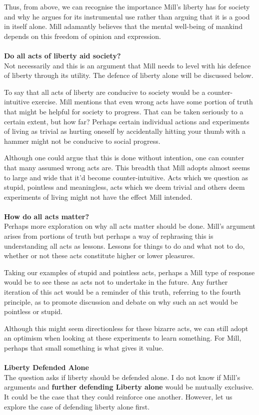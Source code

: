 \documentclass[12pt, letterpaper]{article}
\begin{document}
Thus, from above, we can recognise the importance Mill's liberty has for society and why he argues for its instrumental use rather than arguing that it is a good in itself alone. Mill adamantly believes that the mental well-being of mankind depends on this freedom of opinion and expression.
\\\\
\textbf{Do all acts of liberty aid society?}
\\
Not necessarily and this is an argument that Mill needs to level with his defence of liberty through its utility. The defence of liberty alone will be discussed below.

To say that all acts of liberty are conducive to society would be a counter-intuitive exercise. Mill mentions that even wrong acts have some portion of truth that might be helpful for society to progress. That can be taken seriously to a certain extent, but how far? Perhaps certain individual actions and experiments of living as trivial as hurting oneself by accidentally hitting your thumb with a hammer might not be conducive to social progress.

Although one could argue that this is done without intention, one can counter that many assumed wrong acts are. This breadth that Mill adopts almost seems to large and wide that it'd become counter-intuitive. Acts which we question as stupid, pointless and meaningless, acts which we deem trivial and others deem experiments of living might not have the effect Mill intended.
\\\\
\textbf{How do all acts matter?}
\\
Perhaps more exploration on why all acts matter should be done. Mill's argument arises from portions of truth but perhaps a way of rephrasing this is understanding all acts as lessons. Lessons for things to do and what not to do, whether or not these acts constitute higher or lower pleasures.

Taking our examples of stupid and pointless acts, perhaps a Mill type of response would be to see these as acts not to undertake in the future. Any further iteration of this act would be a reminder of this truth, referring to the fourth principle, as to promote discussion and debate on why such an act would be pointless or stupid.

Although this might seem directionless for these bizarre acts, we can still adopt an optimism when looking at these experiments to learn something. For Mill, perhaps that small something is what gives it value.
\\\\
\textbf{Liberty Defended Alone}\\
The question asks if liberty should be defended alone. I do not know if Mill's arguments and \textbf{further defending Liberty alone} would be mutually exclusive. It could be the case that they could reinforce one another. However, let us explore the case of defending liberty alone first.
\end{document}
